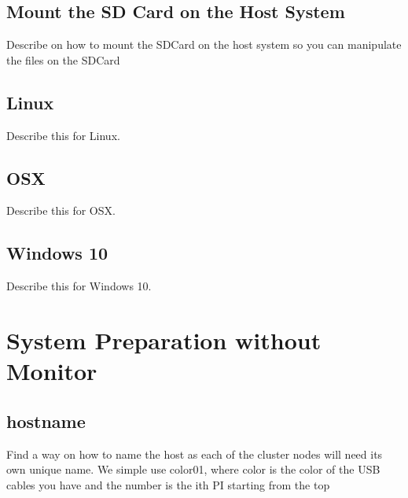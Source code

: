 \subsection{Mount the SD Card on the Host System}

\begin{exercise}
Describe on how to mount the SDCard on the host system so you can
manipulate the files on the SDCard
\end{exercise}

\subsection{Linux}


\begin{exercise}
Describe this for Linux.
\end{exercise}

\subsection{OSX}


\begin{exercise}
Describe this for OSX.
\end{exercise}


\subsection{Windows 10}

\begin{exercise}
Describe this for Windows 10.
\end{exercise}


\section{System Preparation without Monitor}


\subsection{hostname}

\begin{exercise}
Find a way on how to name the host as each of the cluster nodes will
need its own unique name. We simple use color01, where color is the
color of the USB cables you have and the number is the ith PI starting
from the top
\end{exercise}


